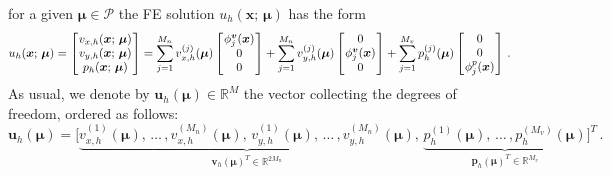 \documentclass[12pt, a4paper, twoside, openright]{report}
\numberwithin{equation}{chapter}
\theoremstyle{theorem}
\theoremstyle{definition}
\theoremstyle{remark}
\theoremstyle{proposition}
\numberwithin{figure}{chapter}
\newcommand{\bg}[1]{\boldsymbol{#1}}
\begin{document}
		for a given $\bg{\mu} \in \mathcal{P}$ the FE solution $u_h(\bg{x}; \, \bg{\mu})$ has the form
		\begin{equation*}
			u_h(\bg{x}; \, \bg{\mu}) = 
			\begin{bmatrix}
			\hspace*{-0.15cm}
			\begin{array}{c}
				v_{x,h}(\bg{x}; \, \bg{\mu}) \\
				v_{y,h}(\bg{x}; \, \bg{\mu}) \\
				p_{h}(\bg{x}; \, \bg{\mu})
			\end{array} 
			\hspace*{-0.15cm}
			\end{bmatrix}
			= \sum_{j = 1}^{M_n} v_{x,h}^{(j)}(\bg{\mu}) 
			\begin{bmatrix}
			\hspace*{-0.15cm}
			\begin{array}{c}
				\phi_j^{\bg{v}}(\bg{x}) \\ 
				0 \\ 
				0 
			\end{array} 
			\hspace*{-0.15cm}
			\end{bmatrix}
			+
			\sum_{j = 1}^{M_n} v_{y,h}^{(j)}(\bg{\mu}) 
			\begin{bmatrix}
			\hspace*{-0.15cm}
			\begin{array}{c}
				0 \\
				\phi_j^{\bg{v}}(\bg{x}) \\  
				0 
			\end{array} 
			\hspace*{-0.15cm}
			\end{bmatrix}
			+
			\sum_{j = 1}^{M_v} p_h^{(j)}(\bg{\mu})
			\begin{bmatrix}
			\hspace*{-0.15cm}
			\begin{array}{c}
				0 \\
				0 \\  
				\phi_j^{p}(\bg{x}) 
			\end{array} 
			\hspace*{-0.15cm}
			\end{bmatrix} \, .
		\end{equation*}
		As usual, we denote by $\mathbf{u}_h(\bg{\mu}) \in \mathbb{R}^M$ the vector collecting the degrees of freedom, ordered as follows:
		\begin{equation*}
			\mathbf{u}_h(\bg{\mu}) = \big[ \underbrace{v_{x,h}^{(1)}(\bg{\mu}), \, \ldots \, , v_{x,h}^{(M_n)}(\bg{\mu}), \, v_{y,h}^{(1)}(\bg{\mu}), \, \ldots \, , v_{y,h}^{(M_n)}(\bg{\mu})}_{\mathbf{v}_h(\bg{\mu})^T \in \mathbb{R}^{2 M_n}}, \, \underbrace{p_h^{(1)}(\bg{\mu}), \, \ldots \, , p_h^{(M_v)}(\bg{\mu})}_{\mathbf{p}_h(\bg{\mu})^T \in \mathbb{R}^{M_v}} \big]^T \, .
		\end{equation*}
\end{document}
